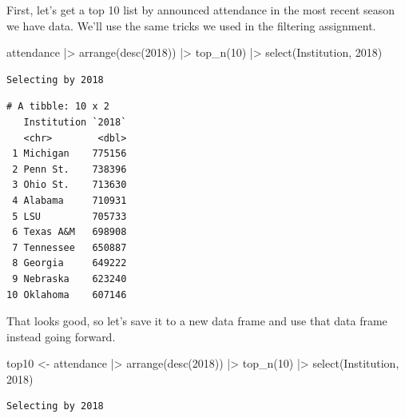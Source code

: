 \documentclass[
  letterpaper,
  DIV=11,
  numbers=noendperiod]{scrreprt}
\newenvironment{Shaded}{\begin{snugshade}}{\end{snugshade}}
\newcommand{\AttributeTok}[1]{\textcolor[rgb]{0.40,0.45,0.13}{#1}}
\newcommand{\DecValTok}[1]{\textcolor[rgb]{0.68,0.00,0.00}{#1}}
\newcommand{\FunctionTok}[1]{\textcolor[rgb]{0.28,0.35,0.67}{#1}}
\newcommand{\NormalTok}[1]{\textcolor[rgb]{0.00,0.23,0.31}{#1}}
\newcommand{\OtherTok}[1]{\textcolor[rgb]{0.00,0.23,0.31}{#1}}
\newcommand{\SpecialCharTok}[1]{\textcolor[rgb]{0.37,0.37,0.37}{#1}}
\newcommand{\StringTok}[1]{\textcolor[rgb]{0.13,0.47,0.30}{#1}}
\begin{document}
First, let's get a top 10 list by announced attendance in the most
recent season we have data. We'll use the same tricks we used in the
filtering assignment.

\begin{Shaded}
\begin{Highlighting}[]
\NormalTok{attendance }\SpecialCharTok{|\textgreater{}} 
  \FunctionTok{arrange}\NormalTok{(}\FunctionTok{desc}\NormalTok{(}\StringTok{\textasciigrave{}}\AttributeTok{2018}\StringTok{\textasciigrave{}}\NormalTok{)) }\SpecialCharTok{|\textgreater{}} 
  \FunctionTok{top\_n}\NormalTok{(}\DecValTok{10}\NormalTok{) }\SpecialCharTok{|\textgreater{}} 
  \FunctionTok{select}\NormalTok{(Institution, }\StringTok{\textasciigrave{}}\AttributeTok{2018}\StringTok{\textasciigrave{}}\NormalTok{)}
\end{Highlighting}
\end{Shaded}

\begin{verbatim}
Selecting by 2018
\end{verbatim}

\begin{verbatim}
# A tibble: 10 x 2
   Institution `2018`
   <chr>        <dbl>
 1 Michigan    775156
 2 Penn St.    738396
 3 Ohio St.    713630
 4 Alabama     710931
 5 LSU         705733
 6 Texas A&M   698908
 7 Tennessee   650887
 8 Georgia     649222
 9 Nebraska    623240
10 Oklahoma    607146
\end{verbatim}

That looks good, so let's save it to a new data frame and use that data
frame instead going forward.

\begin{Shaded}
\begin{Highlighting}[]
\NormalTok{top10 }\OtherTok{\textless{}{-}}\NormalTok{ attendance }\SpecialCharTok{|\textgreater{}}
  \FunctionTok{arrange}\NormalTok{(}\FunctionTok{desc}\NormalTok{(}\StringTok{\textasciigrave{}}\AttributeTok{2018}\StringTok{\textasciigrave{}}\NormalTok{)) }\SpecialCharTok{|\textgreater{}} 
  \FunctionTok{top\_n}\NormalTok{(}\DecValTok{10}\NormalTok{) }\SpecialCharTok{|\textgreater{}} 
  \FunctionTok{select}\NormalTok{(Institution, }\StringTok{\textasciigrave{}}\AttributeTok{2018}\StringTok{\textasciigrave{}}\NormalTok{)}
\end{Highlighting}
\end{Shaded}

\begin{verbatim}
Selecting by 2018
\end{verbatim}
\end{document}
